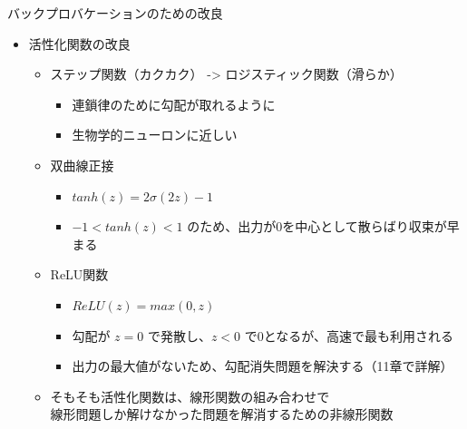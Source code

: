 \documentclass[aspectratio=169, dvipdfmx, 14pt, xcolor={svgnames,dvipsnames}]{beamer}
\def\tightlist{\itemsep1pt\parskip0pt\parsep0pt}
\begin{document}

\begin{frame}{\quad バックプロバケーションのための改良}
  \begin{itemize}
    \item
          活性化関数の改良

          \begin{itemize}
            \tightlist
            \item
                  ステップ関数\alert{（カクカク）} -\textgreater{}
                  ロジスティック関数\alert{（滑らか）}

                  \begin{itemize}
                    \tightlist
                    \item
                          \alert{連鎖律のために勾配が取れるように}
                    \item
                          生物学的ニューロンに近しい
                  \end{itemize}
            \item
                  双曲線正接

                  \begin{itemize}
                    \tightlist
                    \item
                          $tanh(z) = 2\sigma(2z)-1$
                    \item
                          $-1 < tanh(z) < 1$
                          のため、出力が0を中心として散らばり収束が早まる
                  \end{itemize}
            \item
                  ReLU関数

                  \begin{itemize}
                    \tightlist
                    \item
                          $ReLU(z) = max(0, z)$
                    \item
                          勾配が $z = 0$ で発散し、$z < 0$
                          で$0$となるが、高速で\alert{最も利用される}
                    \item
                          出力の最大値がないため、\alert{勾配消失問題を解決する}（11章で詳解）
                  \end{itemize}
            \item
                  そもそも活性化関数は、線形関数の組み合わせで\\線形問題しか解けなかった問題を解消するための非線形関数
          \end{itemize}
  \end{itemize}
\end{frame}
\end{document}

